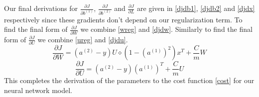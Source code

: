 \documentclass{article}
\begin{document}
Our final derivations for \(\frac{\partial J}{\partial b^{(1)}}\), \(\frac{\partial J}{\partial b^{(2)}}\) and \(\frac{\partial J}{\partial L}\) are given in \eqref{djdb1}, \eqref{djdb2} and \eqref{djdx} respectively since these gradients don't depend on our regularization term.  To find the final form of \(\frac{\partial J}{\partial W}\) we combine \eqref{wreg} and \eqref{djdw}.  Similarly to find the final form of \(\frac{\partial J}{\partial U}\) we combine \eqref{ureg} and \eqref{djdu}.
\begin{equation}
\frac{\partial J}{\partial W} = \left(a^{(2)} - y\right) U \diamond\left( 1-(a^{(1)})^2 \right) x^T +\frac{C}{m}W
\end{equation}
\begin{equation}
\frac{\partial J}{\partial U} = \left(a^{(2)} - y\right)(a^{(1)})^T + \frac{C}{m}U
\end{equation}
This completes the derivation of the parameters to the cost function \eqref{cost} for our neural network model.
\end{document}
